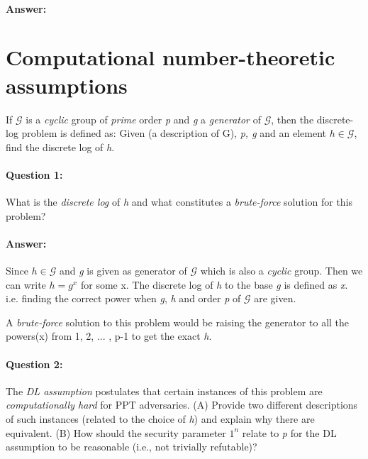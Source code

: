\documentclass{article}
\begin{document}
        \paragraph{Answer: \newline}
    
\section{Computational number-theoretic assumptions}
    If $\mathcal{G}$ is a \emph{cyclic} group of \emph{prime} order \emph{p} and \emph{g} a \emph{generator} of $\mathcal{G}$, then the discrete-log problem is defined as: Given (a description of G), \emph{p, g} and an element $h \in \mathcal{G}$, find the discrete log of \emph{h}.
    
    \paragraph{Question 1:} What is the \emph{discrete log} of \emph{h} and what constitutes a \emph{brute-force} solution for this problem?
    \paragraph{Answer: \newline}
        Since $h \in \mathcal{G}$ and \emph{g} is given as generator of $\mathcal{G}$ which is also a \emph{cyclic} group. Then we can write $h = g^x$ for some x. \newline
        The discrete log of \emph{h} to the base \emph{g} is defined as \emph{x}. i.e. finding the correct power when \emph{g}, \emph{h} and order \emph{p} of $\mathcal{G}$ are given.\newline
        
        A \emph{brute-force} solution to this problem would be raising the generator to all the powers(x) from 1, 2, ... , p-1 to get the exact \emph{h}. 
        
    \paragraph{Question 2:} The \emph{DL assumption} postulates that certain instances of this problem are \emph{computationally hard} for PPT adversaries. (A) Provide two different descriptions of such instances (related to the choice of \emph{h}) and explain why there are equivalent. (B) How should the security parameter $1^n$ relate to \emph{p} for the DL assumption to be reasonable (i.e., not trivially refutable)?
\end{document}
